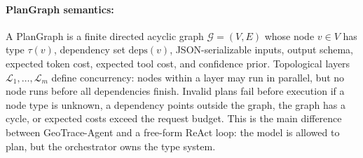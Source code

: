 \documentclass{article}
\begin{document}
\paragraph{PlanGraph semantics:}
A PlanGraph is a finite directed acyclic graph $\mathcal{G}=(V,E)$ whose node $v\in V$ has type $\tau(v)$, dependency set $\mathrm{deps}(v)$, JSON-serializable inputs, output schema, expected token cost, expected tool cost, and confidence prior. Topological layers $\mathcal{L}_1,\ldots,\mathcal{L}_m$ define concurrency: nodes within a layer may run in parallel, but no node runs before all dependencies finish. Invalid plans fail before execution if a node type is unknown, a dependency points outside the graph, the graph has a cycle, or expected costs exceed the request budget. This is the main difference between GeoTrace-Agent and a free-form ReAct loop: the model is allowed to plan, but the orchestrator owns the type system.
\end{document}
